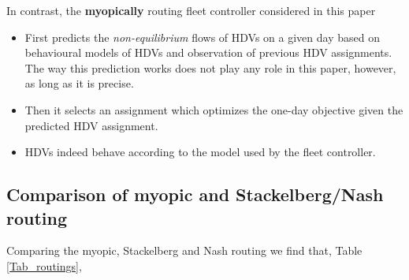 \documentclass[a4paper,11pt]{article}
\begin{document}
\noindent In contrast, the {\bf myopically} routing fleet controller considered in this paper 
\begin{itemize}
\item First {predicts} the \emph{non-equilibrium} flows of HDVs on a given day based on behavioural models of HDVs and observation of previous HDV assignments. The way this prediction works does not play any role in this paper, however, as long as it is precise.
\item Then it selects an assignment which optimizes the one-day objective given the predicted HDV assignment. 
\item HDVs indeed behave according to the model used by the fleet controller. 
\end{itemize}

\subsection{Comparison of myopic and Stackelberg/Nash routing}
\noindent Comparing the myopic, Stackelberg and Nash routing we find that, Table \ref{Tab_routings},
\end{document}
